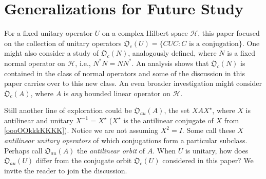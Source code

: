 \documentclass{dis}
\theoremstyle{plain}
\theoremstyle{definition}
\def\T{\mathbb{T}}
\renewcommand{\phi}{\varphi}
\newcommand{\0}{{\color{lightgray}0}}
\begin{document}


\chapter{Generalizations for Future Study}

For a fixed unitary operator $U$ on a complex Hilbert space  $\mathcal{H}$, this paper focused on the collection of unitary operators  $\mathfrak{O}_c(U) = \{CUC: \mbox{$C$ is a conjugation}\}$. One might also consider a study of $\mathfrak{O}_c(N)$, analogously defined, where $N$ is a fixed normal operator on $\mathcal{H}$, i.e., $N^{*} N = N N^{*}$. An analysis  shows that $\mathfrak{O}_c(N)$ is contained in the class of normal operators and some of the  discussion in this paper carries over to this new class. An even broader investigation might consider $\mathfrak{O}_c(A)$, where $A$ is {\em any} bounded linear operator on $\mathcal{H}$. 

Still another line of exploration could be $\mathfrak{O}_{au}(A)$, the set $X A X^{\star}$, where $X$ is antilinear and unitary $X^{-1} = X^{\star}$  ($X^{\star}$ is the antilinear conjugate of $X$ from \eqref{oooOOkkkKKKK}). Notice we are not assuming $X^2 = I$. Some call these $X$ {\em antilinear unitary operators} of which conjugations form a particular subclass. Perhaps call $\mathfrak{O}_{au}(A)$ the {\em antilinear orbit} of $A$. When $U$ is unitary, how does $\mathfrak{O}_{au}(U)$ differ from the conjugate orbit $\mathfrak{O}_c(U)$ considered in this paper? We invite the reader to join the discussion. 




\end{document}
